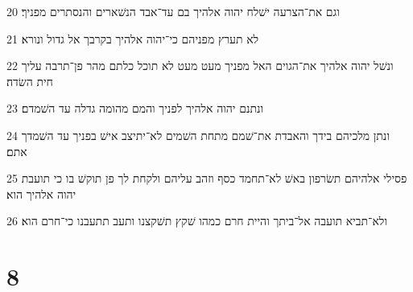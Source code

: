 \par 20 וגם את־הצרעה ישׁלח יהוה אלהיך בם עד־אבד הנשׁארים והנסתרים מפניך׃
\par 21 לא תערץ מפניהם כי־יהוה אלהיך בקרבך אל גדול ונורא׃
\par 22 ונשׁל יהוה אלהיך את־הגוים האל מפניך מעט מעט לא תוכל כלתם מהר פן־תרבה עליך חית השׂדה׃
\par 23 ונתנם יהוה אלהיך לפניך והמם מהומה גדלה עד השׁמדם׃
\par 24 ונתן מלכיהם בידך והאבדת את־שׁמם מתחת השׁמים לא־יתיצב אישׁ בפניך עד השׁמדך אתם׃
\par 25 פסילי אלהיהם תשׂרפון באשׁ לא־תחמד כסף וזהב עליהם ולקחת לך פן תוקשׁ בו כי תועבת יהוה אלהיך הוא׃
\par 26 ולא־תביא תועבה אל־ביתך והיית חרם כמהו שׁקץ תשׁקצנו ותעב תתעבנו כי־חרם הוא׃

\chapter{8}

